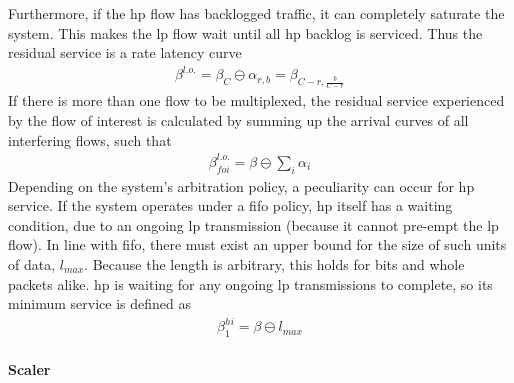 Furthermore, if the \gls{hp} flow has backlogged traffic, it can completely saturate the system. This makes the \gls{lp} flow wait until all \gls{hp} backlog is serviced.
Thus the residual service is a rate latency curve
%
\begin{align}
\beta^{l.o.} = \beta_C \ominus \alpha_{r,b} = \beta_{C-r, \frac{b}{C-r}}
\label{eq:nc_res_serv1}
\end{align}
%
If there is more than one flow to be multiplexed, the residual service experienced by the flow of interest is calculated by summing up
the arrival curves of all interfering flows, such that
%
\begin{align}
\beta^{l.o.}_{foi} = \beta \ominus \sum_i \alpha_i
\label{eq:nc_res_serv2}
\end{align}
%
Depending on the system's arbitration policy, a peculiarity can occur for \gls{hp} service.
If the system operates under a \gls{fifo} policy, \gls{hp} itself has a waiting condition, due to an ongoing \gls{lp} transmission (because it cannot pre-empt the \gls{lp} flow).
In line with \gls{fifo}, there must exist an upper bound for the size of such units of data, $l_{max}$. Because the length is arbitrary, this holds for bits and whole packets alike.
\gls{hp} is waiting for any ongoing \gls{lp} transmissions to complete, so its minimum service is defined as
%
\begin{align}
\beta^{hi}_1 = \beta \ominus l_{max}
\label{eq:serv_pl3}
\end{align}
%



\paragraph{Scaler}

